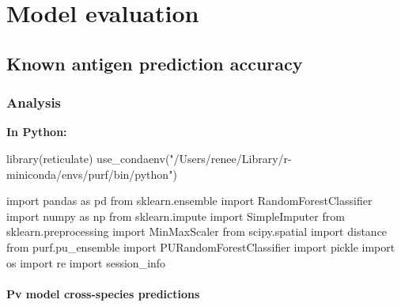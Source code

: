 \documentclass[
  11pt,
  oneside]{book}
\newenvironment{Shaded}{\begin{snugshade}}{\end{snugshade}}
\newcommand{\FunctionTok}[1]{\textcolor[rgb]{0.00,0.00,0.00}{#1}}
\newcommand{\ImportTok}[1]{#1}
\newcommand{\NormalTok}[1]{#1}
\newcommand{\StringTok}[1]{\textcolor[rgb]{0.31,0.60,0.02}{#1}}
\begin{document}
\hypertarget{03_model_evaluation}{%
\chapter{Model evaluation}\label{03_model_evaluation}}

\hypertarget{known-antigen-prediction-accuracy}{%
\section{Known antigen prediction accuracy}\label{known-antigen-prediction-accuracy}}

\hypertarget{analysis-1}{%
\subsection{Analysis}\label{analysis-1}}

\textbf{In Python: }

\begin{Shaded}
\begin{Highlighting}[]
\FunctionTok{library}\NormalTok{(reticulate)}
\FunctionTok{use\_condaenv}\NormalTok{(}\StringTok{"/Users/renee/Library/r{-}miniconda/envs/purf/bin/python"}\NormalTok{)}
\end{Highlighting}
\end{Shaded}

\begin{Shaded}
\begin{Highlighting}[]
\ImportTok{import}\NormalTok{ pandas }\ImportTok{as}\NormalTok{ pd}
\ImportTok{from}\NormalTok{ sklearn.ensemble }\ImportTok{import}\NormalTok{ RandomForestClassifier}
\ImportTok{import}\NormalTok{ numpy }\ImportTok{as}\NormalTok{ np}
\ImportTok{from}\NormalTok{ sklearn.impute }\ImportTok{import}\NormalTok{ SimpleImputer}
\ImportTok{from}\NormalTok{ sklearn.preprocessing }\ImportTok{import}\NormalTok{ MinMaxScaler}
\ImportTok{from}\NormalTok{ scipy.spatial }\ImportTok{import}\NormalTok{ distance}
\ImportTok{from}\NormalTok{ purf.pu\_ensemble }\ImportTok{import}\NormalTok{ PURandomForestClassifier}
\ImportTok{import}\NormalTok{ pickle}
\ImportTok{import}\NormalTok{ os}
\ImportTok{import}\NormalTok{ re}
\ImportTok{import}\NormalTok{ session\_info}
\end{Highlighting}
\end{Shaded}

\hypertarget{pv-model-cross-species-predictions}{%
\subsubsection{Pv model cross-species predictions}\label{pv-model-cross-species-predictions}}
\end{document}
